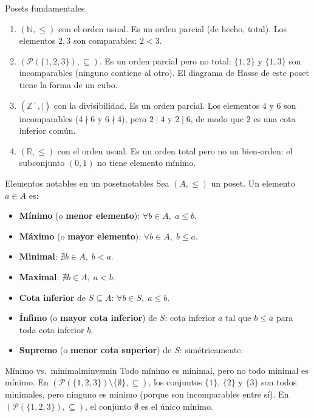 \begin{ejemplo}{Posets fundamentales}{}
\begin{enumerate}[leftmargin=2em, label=(\alph*)]
  \item $(\mathbb{N}, \leq)$ con el orden usual. Es un orden parcial (de hecho, total). Los elementos $2, 3$ son comparables: $2 < 3$.

  \item $(\mathcal{P}(\{1,2,3\}), \subseteq)$. Es un orden parcial pero no total: $\{1,2\}$ y $\{1,3\}$ son incomparables (ninguno contiene al otro). El diagrama de Hasse de este poset tiene la forma de un cubo.

  \item $(\mathbb{Z}^+, \mid)$ con la divisibilidad. Es un orden parcial. Los elementos $4$ y $6$ son incomparables ($4 \nmid 6$ y $6 \nmid 4$), pero $2 \mid 4$ y $2 \mid 6$, de modo que $2$ es una cota inferior común.

  \item $(\mathbb{R}, \leq)$ con el orden usual. Es un orden total pero no un bien-orden: el subconjunto $(0,1)$ no tiene elemento mínimo.
\end{enumerate}
\end{ejemplo}

\begin{definicion}{Elementos notables en un poset}{notables}
Sea $(A, \leq)$ un poset. Un elemento $a \in A$ es:
\begin{itemize}[leftmargin=2em]
  \item \textbf{Mínimo} (o \textbf{menor elemento}): $\forall b \in A,\; a \leq b$.
  \item \textbf{Máximo} (o \textbf{mayor elemento}): $\forall b \in A,\; b \leq a$.
  \item \textbf{Minimal}: $\nexists b \in A,\; b < a$.
  \item \textbf{Maximal}: $\nexists b \in A,\; a < b$.
  \item \textbf{Cota inferior} de $S \subseteq A$: $\forall b \in S,\; a \leq b$.
  \item \textbf{Ínfimo} (o \textbf{mayor cota inferior}) de $S$: cota inferior $a$ tal que $b \leq a$ para toda cota inferior $b$.
  \item \textbf{Supremo} (o \textbf{menor cota superior}) de $S$: simétricamente.
\end{itemize}
\end{definicion}

\begin{observacion}{Mínimo vs.\ minimal}{minvsmin}
Todo mínimo es minimal, pero no todo minimal es mínimo. En $(\mathcal{P}(\{1,2,3\}) \setminus \{\emptyset\}, \subseteq)$, los conjuntos $\{1\}$, $\{2\}$ y $\{3\}$ son todos minimales, pero ninguno es mínimo (porque son incomparables entre sí). En $(\mathcal{P}(\{1,2,3\}), \subseteq)$, el conjunto $\emptyset$ es el único mínimo.
\end{observacion}

